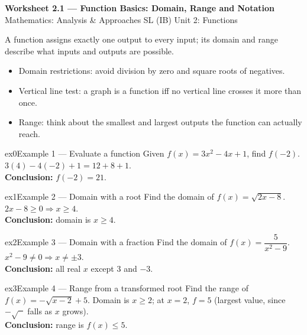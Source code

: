\documentclass[11pt]{article}
\begin{document}
\begin{center}
{\LARGE\bfseries\color{titleblue}Worksheet 2.1 --- Function Basics: Domain, Range and Notation}\\[2pt]
{\small Mathematics: Analysis \& Approaches SL (IB) \textperiodcentered{} Unit 2: Functions}
\end{center}

\begin{ideabox}
A function assigns exactly one output to every input; its domain and range describe what inputs and outputs are possible.
\begin{itemize}[leftmargin=*,itemsep=2pt]
  \item Domain restrictions: avoid division by zero and square roots of negatives.
  \item Vertical line test: a graph is a function iff no vertical line crosses it more than once.
  \item Range: think about the smallest and largest outputs the function can actually reach.
\end{itemize}
\end{ideabox}


\begin{example}{ex0}{Example 1 --- Evaluate a function}
Given $f(x)=3x^2-4x+1$, find $f(-2)$.\soln
$3(4)-4(-2)+1=12+8+1$.\\[3pt]\textbf{Conclusion:} $f(-2)=21$.
\end{example}

\begin{example}{ex1}{Example 2 --- Domain with a root}
Find the domain of $f(x)=\sqrt{2x-8}$.\soln
$2x-8\geq0\Rightarrow x\geq4$.\\[3pt]\textbf{Conclusion:} domain is $x\geq4$.
\end{example}

\begin{example}{ex2}{Example 3 --- Domain with a fraction}
Find the domain of $f(x)=\dfrac{5}{x^2-9}$.\soln
$x^2-9\neq0\Rightarrow x\neq\pm3$.\\[3pt]\textbf{Conclusion:} all real $x$ except $3$ and $-3$.
\end{example}

\begin{example}{ex3}{Example 4 --- Range from a transformed root}
Find the range of $f(x)=-\sqrt{x-2}+5$.\soln
Domain is $x\geq2$; at $x=2$, $f=5$ (largest value, since $-\sqrt{\phantom x}$ falls as $x$ grows).\\[3pt]\textbf{Conclusion:} range is $f(x)\leq5$.
\end{example}
\end{document}
